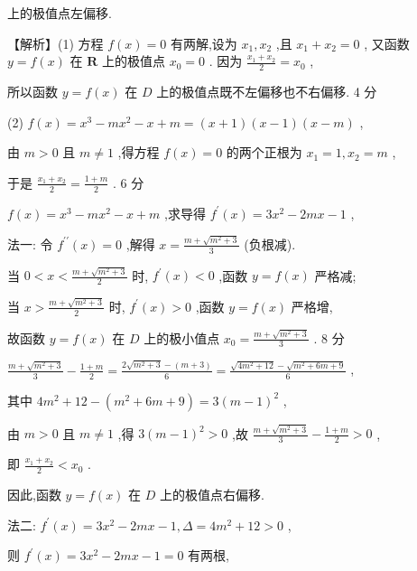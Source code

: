 \documentclass[10pt]{article}
\begin{document}
上的极值点左偏移.

【解析】(1) 方程 \(f\left( x\right)  = 0\) 有两解,设为 \({x}_{1},{x}_{2}\) ,且 \({x}_{1} + {x}_{2} = 0\) , 又函数 \(y = f\left( x\right)\) 在 \(\mathbf{R}\) 上的极值点 \({x}_{0} = 0\) . 因为 \(\frac{{x}_{1} + {x}_{2}}{2} = {x}_{0}\) ,

所以函数 \(y = f\left( x\right)\) 在 \(D\) 上的极值点既不左偏移也不右偏移. 4 分

(2) \(f\left( x\right)  = {x}^{3} - m{x}^{2} - x + m = \left( {x + 1}\right) \left( {x - 1}\right) \left( {x - m}\right)\) ,

由 \(m > 0\) 且 \(m \neq  1\) ,得方程 \(f\left( x\right)  = 0\) 的两个正根为 \({x}_{1} = 1,{x}_{2} = m\) ,

于是 \(\frac{{x}_{1} + {x}_{2}}{2} = \frac{1 + m}{2}\) . 6 分

\(f\left( x\right)  = {x}^{3} - m{x}^{2} - x + m\) ,求导得 \({f}^{\prime }\left( x\right)  = 3{x}^{2} - {2mx} - 1\) ,

法一: 令 \({f}^{\prime \prime }\left( x\right)  = 0\) ,解得 \(x = \frac{m + \sqrt{{m}^{2} + 3}}{3}\) (负根减).

当 \(0 < x < \frac{m + \sqrt{{m}^{2} + 3}}{2}\) 时, \({f}^{\prime }\left( x\right)  < 0\) ,函数 \(y = f\left( x\right)\) 严格减;

当 \(x > \frac{m + \sqrt{{m}^{2} + 3}}{2}\) 时, \({f}^{\prime }\left( x\right)  > 0\) ,函数 \(y = f\left( x\right)\) 严格增,

故函数 \(y = f\left( x\right)\) 在 \(D\) 上的极小值点 \({x}_{0} = \frac{m + \sqrt{{m}^{2} + 3}}{3}\) . 8 分

\(\frac{m + \sqrt{{m}^{2} + 3}}{3} - \frac{1 + m}{2} = \frac{2\sqrt{{m}^{2} + 3} - \left( {m + 3}\right) }{6} = \frac{\sqrt{4{m}^{2} + {12}} - \sqrt{{m}^{2} + {6m} + 9}}{6}\) ,

其中 \(4{m}^{2} + {12} - \left( {{m}^{2} + {6m} + 9}\right)  = 3{\left( m - 1\right) }^{2}\) ,

由 \(m > 0\) 且 \(m \neq  1\) ,得 \(3{\left( m - 1\right) }^{2} > 0\) ,故 \(\frac{m + \sqrt{{m}^{2} + 3}}{3} - \frac{1 + m}{2} > 0\) ,

即 \(\frac{{x}_{1} + {x}_{2}}{2} < {x}_{0}\) .

因此,函数 \(y = f\left( x\right)\) 在 \(D\) 上的极值点右偏移.

法二: \({f}^{\prime }\left( x\right)  = 3{x}^{2} - {2mx} - 1,\Delta  = 4{m}^{2} + {12} > 0\) ,

则 \({f}^{\prime }\left( x\right)  = 3{x}^{2} - {2mx} - 1 = 0\) 有两根,
\end{document}
